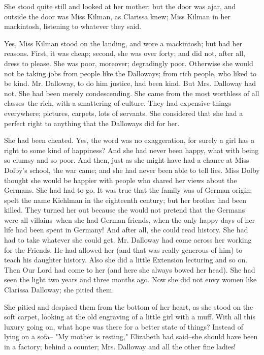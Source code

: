 \documentclass[lang=cn,10pt]{elegantbook}
\begin{document}
She stood quite still and looked at her mother; but the door was
ajar, and outside the door was Miss Kilman, as Clarissa knew; Miss
Kilman in her mackintosh, listening to whatever they said.

Yes, Miss Kilman stood on the landing, and wore a mackintosh; but
had her reasons.  First, it was cheap; second, she was over forty;
and did not, after all, dress to please.  She was poor, moreover;
degradingly poor.  Otherwise she would not be taking jobs from
people like the Dalloways; from rich people, who liked to be kind.
Mr. Dalloway, to do him justice, had been kind.  But Mrs. Dalloway
had not.  She had been merely condescending.  She came from the
most worthless of all classes--the rich, with a smattering of
culture.  They had expensive things everywhere; pictures, carpets,
lots of servants.  She considered that she had a perfect right to
anything that the Dalloways did for her.

She had been cheated.  Yes, the word was no exaggeration, for
surely a girl has a right to some kind of happiness?  And she had
never been happy, what with being so clumsy and so poor.  And then,
just as she might have had a chance at Miss Dolby's school, the war
came; and she had never been able to tell lies.  Miss Dolby thought
she would be happier with people who shared her views about the
Germans.  She had had to go.  It was true that the family was of
German origin; spelt the name Kiehlman in the eighteenth century;
but her brother had been killed.  They turned her out because she
would not pretend that the Germans were all villains--when she had
German friends, when the only happy days of her life had been spent
in Germany!  And after all, she could read history.  She had had to
take whatever she could get.  Mr. Dalloway had come across her
working for the Friends.  He had allowed her (and that was really
generous of him) to teach his daughter history.  Also she did a
little Extension lecturing and so on.  Then Our Lord had come to
her (and here she always bowed her head).  She had seen the light
two years and three months ago.  Now she did not envy women like
Clarissa Dalloway; she pitied them.

She pitied and despised them from the bottom of her heart, as she
stood on the soft carpet, looking at the old engraving of a little
girl with a muff.  With all this luxury going on, what hope was
there for a better state of things?  Instead of lying on a sofa--
"My mother is resting," Elizabeth had said--she should have been in
a factory; behind a counter; Mrs. Dalloway and all the other fine
ladies!
\end{document}

